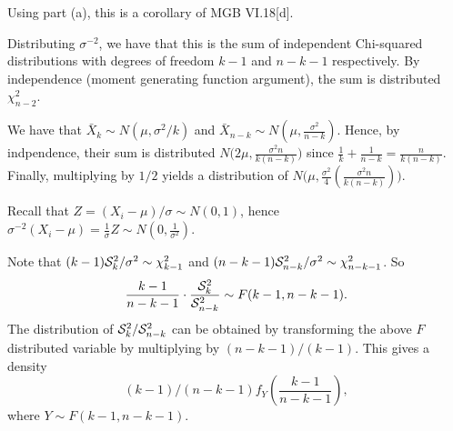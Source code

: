 \documentclass{stat_homework}
\begin{document}
\begin{solution}
  Using part (a), this is a corollary of MGB VI.18[d].
\end{solution}
\newpage



Distributing $\sigma^{-2}$, we have that this is the sum of independent Chi-squared distributions with degrees of freedom $k-1$ and $n-k-1$ respectively.  By independence (moment generating function argument), the sum is distributed $\chi^2_{n-2}$.


We have that $\bar X_k \sim N(\mu,\sigma^2/k)$ and $\bar X_{n-k} \sim N(\mu,\frac {\sigma^2}{n-k})$.  Hence, by indpendence, their sum is distributed $N\Big(2\mu, \frac{\sigma^2n}{k(n-k)}\Big)$ since $\frac 1k + \frac 1{n-k} = \frac n{k(n-k)}$.  Finally, multiplying by $1/2$ yields a distribution of $N\Big(\mu, \frac{\sigma^2}{4}(\frac{\sigma^2n}{k(n-k)})\Big)$.


Recall that $Z = (X_i - \mu)/\sigma \sim N(0,1)$, hence $\sigma^{-2}(X_i-\mu) = \frac 1\sigma Z \sim N(0,\frac 1{\sigma^2})$.


Note that $(k-1)\mathcal S_k^2/\sigma^2\sim\chi^2_{k-1}$ and $(n-k-1)\mathcal S_{n-k}^2/\sigma^2 \sim \chi^2_{n-k-1}$. So
$$
  \frac{k-1}{n-k-1} \cdot \frac {\mathcal S_k^2}{\mathcal S_{n-k}^2} \sim F(k-1,n-k-1).
$$
The distribution of $\mathcal S_k^2 / \mathcal S_{n-k}^2$ can be obtained by transforming the above $F$ distributed variable by multiplying by $(n-k-1)/(k-1)$.  This gives a density 
$$(k-1)/(n-k-1) f_{Y}\left( \frac{k-1}{n-k-1} \right),$$
where $Y \sim F(k-1,n-k-1)$.
\end{document}
